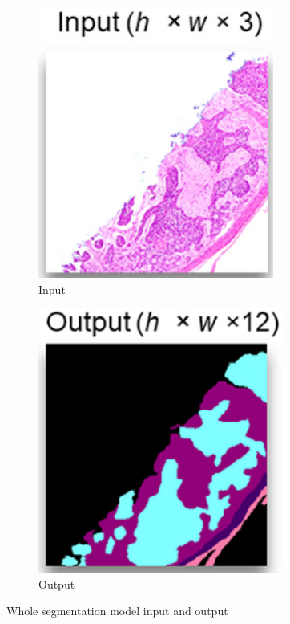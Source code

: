 \begin{figure}[h]
\centering
    \begin{subfigure}[b]{0.3\textwidth}
        \centering
        \includegraphics[scale=.5]{./chapter-03-state-of-the-art/seg-input.png}
        \caption{Input}
        \label{fig:seg-input}
    \end{subfigure}
    \begin{subfigure}[b]{0.3\textwidth}
        \centering
        \includegraphics[scale=.5]{./chapter-03-state-of-the-art/seg-output.png}
        \caption{Output}
        \label{fig:seg-output}
    \end{subfigure}
\caption{Whole segmentation model input and output}
\label{fig:seg-input-output}
\end{figure}







